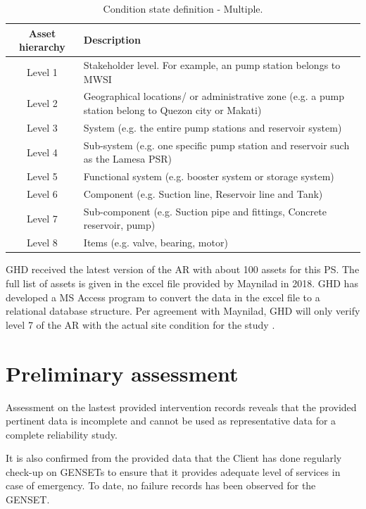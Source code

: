 \begin{table}[h]
	\caption{Condition state definition - Multiple.}
	\label{ch02_tbl_assethierachy}
	{\footnotesize
\begin{tabular}{l|p{10cm}}
	\hline
	\multicolumn{1}{c|}{Asset hierarchy} & Description \\ 
	\hline
	\multicolumn{1}{c|}{Level 1} & Stakeholder level. For example, an pump station belongs to MWSI \\ 
	\multicolumn{1}{c|}{Level 2} & Geographical locations/ or administrative zone (e.g. a pump station belong to Quezon city or Makati) \\ 
	\multicolumn{1}{c|}{Level 3} & System (e.g. the entire pump stations and reservoir system) \\ 
	\multicolumn{1}{c|}{Level 4} & Sub-system (e.g. one specific pump station and reservoir such as the Lamesa PSR) \\ 
	\multicolumn{1}{c|}{Level 5} & Functional system (e.g. booster system or storage system) \\ 
	\multicolumn{1}{c|}{Level 6} & Component (e.g. Suction line, Reservoir line and Tank) \\ 
	\multicolumn{1}{c|}{Level 7} & Sub-component (e.g. Suction pipe and fittings, Concrete reservoir, pump) \\ 
	\multicolumn{1}{c|}{Level 8} & Items (e.g. valve, bearing, motor) \\ 
	\hline
\end{tabular}		
	}
\end{table}

GHD received the latest version of the AR with about 100 assets for this PS. The full list of assets is given in the excel file provided by Maynilad in 2018. GHD has developed a MS Access program to convert the data in the excel file to a relational database structure. Per agreement with Maynilad, GHD will only verify level 7 of the AR with the actual site condition for the study \cite{GHD2018m}. 
\section{Preliminary assessment}
\label{22}
Assessment on the lastest provided intervention records reveals that the provided pertinent data is incomplete and cannot be used as representative data for a complete reliability study. 

It is also confirmed from the provided data that the Client has done regularly check-up on GENSETs to ensure that it provides adequate level of services in case of emergency. To date, no failure records has been observed for the GENSET.

